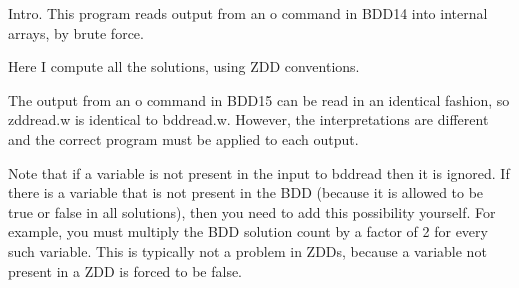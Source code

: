 
\datethis

Intro. This program reads output from an {\mc o} command in  {\mc
BDD14}
into internal arrays, by brute force.

Here I compute all the solutions, using ZDD conventions.

The output from an {\mc o} command in {\mc BDD15}
can be read in an identical fashion,
so {\mc zddread.w} is identical to {\mc bddread.w}.
However, the interpretations are different
and the correct program must be applied to each output.

Note that if a variable is not present in the input to {\mc bddread}
then it is ignored.
If there is a variable that is not present in the BDD
(because it is allowed to be true or false in all solutions),
then you need to add this possibility yourself.
For example, you must multiply the BDD solution count by a factor of 2
for every such variable.
This is typically not a problem in ZDDs,
because a variable not present in a ZDD is forced to be false.

